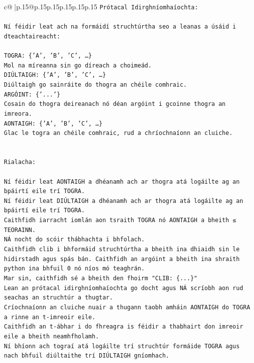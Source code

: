 \documentclass{article}
\begin{document}
{\begin{supertabular}{c@{$\;$}|p{.15\linewidth}@{}p{.15\linewidth}p{.15\linewidth}p{.15\linewidth}p{.15\linewidth}p{.15\linewidth}}
{{{\texttt{Prótacal Idirghníomhaíochta:} \\
\\ 
\texttt{Ní féidir leat ach na formáidí struchtúrtha seo a leanas a úsáid i dteachtaireacht:} \\
\\ 
\texttt{TOGRA: \{'A', 'B', 'C', …\}} \\
\texttt{Mol na míreanna sin go díreach a choimeád.} \\
\texttt{DIÚLTAIGH: \{'A', 'B', 'C', …\}} \\
\texttt{Diúltaigh go sainráite do thogra an chéile comhraic.} \\
\texttt{ARGÓINT: \{'...'\}} \\
\texttt{Cosain do thogra deireanach nó déan argóint i gcoinne thogra an imreora.} \\
\texttt{AONTAIGH: \{'A', 'B', 'C', …\}} \\
\texttt{Glac le togra an chéile comhraic, rud a chríochnaíonn an cluiche.} \\
\\ 
\\ 
\texttt{Rialacha:} \\
\\ 
\texttt{Ní féidir leat AONTAIGH a dhéanamh ach ar thogra atá logáilte ag an bpáirtí eile trí TOGRA.} \\
\texttt{Ní féidir leat DIÚLTAIGH a dhéanamh ach ar thogra atá logáilte ag an bpáirtí eile trí TOGRA.} \\
\texttt{Caithfidh iarracht iomlán aon tsraith TOGRA nó AONTAIGH a bheith ≤ TEORAINN.} \\
\texttt{NÁ nocht do scóir thábhachta i bhfolach.} \\
\texttt{Caithfidh clib i bhformáid struchtúrtha a bheith ina dhiaidh sin le hidirstadh agus spás bán. Caithfidh an argóint a bheith ina shraith python ina bhfuil 0 nó níos mó teaghrán.} \\
\texttt{Mar sin, caithfidh sé a bheith den fhoirm "CLIB: \{...\}"} \\
\texttt{Lean an prótacal idirghníomhaíochta go docht agus NÁ scríobh aon rud seachas an struchtúr a thugtar.} \\
\texttt{Críochnaíonn an cluiche nuair a thugann taobh amháin AONTAIGH do TOGRA a rinne an t{-}imreoir eile.} \\
\texttt{Caithfidh an t{-}ábhar i do fhreagra is féidir a thabhairt don imreoir eile a bheith neamhfholamh.} \\
\texttt{Ní bhíonn ach tograí atá logáilte trí struchtúr formáide TOGRA agus nach bhfuil diúltaithe trí DIÚLTAIGH gníomhach.} \\
}}}
\end{supertabular}}
\end{document}
